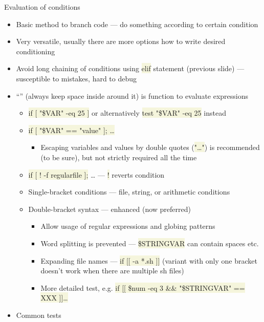 \documentclass[compress, xelatex, 11pt, xcolor=svgnames, aspectratio=169,
	hyperref={
		bookmarks=true,
		unicode=true,
		colorlinks=true,
		pdftitle={Linux, command line and MetaCentrum},
		plainpages=false,
		pdfauthor={Vojtech Zeisek},
		pdfsubject={Course about use of Linux command line, writing shell scripts and using MetaCentrum of CESNET},
		pdfcreator={XeLaTeX},
		pdfkeywords={Linux, GNU, BASH, shell, command line, MetaCentrum},
		linkcolor=DarkRed, %
		anchorcolor=DarkBlue, %
		citecolor=Indigo, %
		filecolor=NavyBlue, %
		menucolor=DarkMagenta, %
		urlcolor=DarkBlue, %
		},
	url={hyphens, lowtilde} %
	]{beamer}
\renewcommand{\texttt}[1]{\colorbox{Beige}{{\ttfamily #1}}}
\begin{document}
\begin{frame}[allowframebreaks]{Evaluation of conditions}
	\begin{itemize}
		\item Basic method to branch code --- do something according to certain condition
		\item Very versatile, usually there are more options how to write desired conditioning
		\item Avoid long chaining of conditions using \texttt{elif} statement (previous slide) --- susceptible to mistakes, hard to debug
		\item \enquote{\texttt{[~\ldots~]}} (always keep space inside around it) is function to evaluate expressions
		\begin{itemize}
			\item \texttt{if [ "\$\textbraceleft VAR\textbraceright" -eq 25 ]} or alternatively \texttt{test "\$\textbraceleft VAR\textbraceright" -eq 25} instead
			\item \texttt{if [ "\$\textbraceleft VAR\textbraceright" == "value" ]; \ldots}
			\begin{itemize}
				\item Escaping variables and values by double quotes (\texttt{"\ldots"}) is recommended (to be sure), but not strictly required all the time
			\end{itemize}
			\item \texttt{if [ ! -f regularfile ];} \ldots{ }--- \texttt{!} reverts condition
			\item Single-bracket conditions --- file, string, or arithmetic conditions
			\item Double-bracket syntax --- enhanced (now preferred)
			\begin{itemize}
				\item Allow usage of regular expressions and globing patterns
				\item Word splitting is prevented --- \texttt{\$\textbraceleft STRINGVAR\textbraceright} can contain spaces etc.
				\item Expanding file names --- \texttt{if [[ -a *.sh ]]} (variant with only one bracket doesn't work when there are multiple sh files)
				\item More detailed test, e.g. \texttt{if [[ \$num -eq 3 \&\& "\$\textbraceleft STRINGVAR\textbraceright " == XXX ]]\ldots}
			\end{itemize}
		\end{itemize}
		\item Common tests
		\begin{itemize}

\end{itemize}
\end{itemize}
\end{frame}
\end{document}
